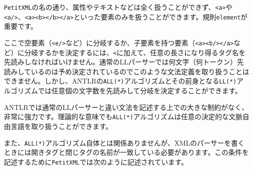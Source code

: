 \texttt{PetitXML}の名の通り、属性やテキストなどは全く扱うことができず、\texttt{\textless{}a\textgreater{}}や\texttt{\textless{}a/\textgreater{}}、\texttt{\textless{}a\textgreater{}\textless{}b\textgreater{}\textless{}/b\textgreater{}\textless{}/a\textgreater{}}といった要素のみを扱うことができます。規則\texttt{element}が重要です。

\begin{Shaded}
\begin{Highlighting}[]
\NormalTok{element returns [}\NormalTok{ e]}
\NormalTok{    : (}\CharTok{\textquotesingle{}\textless{}\textquotesingle{}}\CharTok{\textquotesingle{}\textgreater{}\textquotesingle{}}\CharTok{\textquotesingle{}\textgreater{}\textquotesingle{}}\NormalTok{ \{}
\NormalTok{)}
 \NormalTok{);\})}
\NormalTok{    | (}\CharTok{\textquotesingle{}\textless{}\textquotesingle{}} \NormalTok{);\})}
\NormalTok{    ;}
\end{Highlighting}
\end{Shaded}

ここで空要素（\texttt{\textless{}e/\textgreater{}}など）に分岐するか、子要素を持つ要素（\texttt{\textless{}a\textgreater{}\textless{}b/\textgreater{}\textless{}/a\textgreater{}}など）に分岐するかを決定するには、\texttt{\textless{}}に加えて、任意の長さになり得るタグ名を先読みしなければいけません。通常のLLパーサーでは何文字（何トークン）先読みしているのは予め決定されているのでこのような文法定義を取り扱うことはできません。しかし、ANTLRの\texttt{ALL(*)}アルゴリズムとその前身となる\texttt{LL(*)}アルゴリズムでは任意個の文字数を先読みして分岐を決定することができます。

ANTLRでは通常のLLパーサーと違い文法を記述する上での大きな制約がなく、非常に強力です。理論的な意味でも\texttt{ALL(*)}アルゴリズムは任意の決定的な文脈自由言語を取り扱うことができます。

また、\texttt{ALL(*)}アルゴリズム自体とは関係ありませんが、XMLのパーサーを書くときには開きタグと閉じタグの名前が一致している必要があります。この条件を記述するために\texttt{PetitXML}では次のように記述されています。

